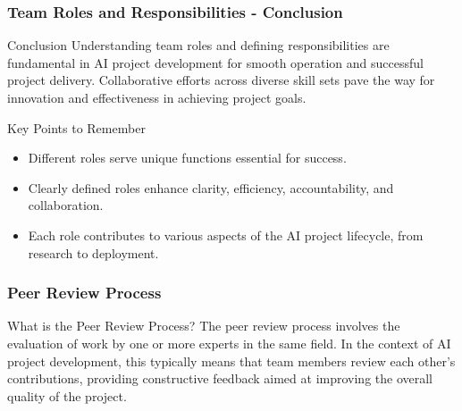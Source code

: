 \documentclass{beamer}
\begin{document}
\begin{frame}[fragile]
    \frametitle{Team Roles and Responsibilities - Conclusion}
    \begin{block}{Conclusion}
        Understanding team roles and defining responsibilities are fundamental in AI project development for smooth operation and successful project delivery.
        Collaborative efforts across diverse skill sets pave the way for innovation and effectiveness in achieving project goals.
    \end{block}

    \begin{block}{Key Points to Remember}
        \begin{itemize}
            \item Different roles serve unique functions essential for success.
            \item Clearly defined roles enhance clarity, efficiency, accountability, and collaboration.
            \item Each role contributes to various aspects of the AI project lifecycle, from research to deployment.
        \end{itemize}
    \end{block}
\end{frame}

\begin{frame}[fragile]
    \frametitle{Peer Review Process}
    \begin{block}{What is the Peer Review Process?}
        The peer review process involves the evaluation of work by one or more experts in the same field. In the context of AI project development, this typically means that team members review each other’s contributions, providing constructive feedback aimed at improving the overall quality of the project.
    \end{block}
\end{frame}
\end{document}
